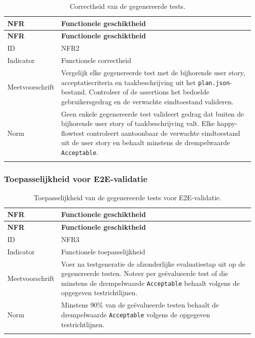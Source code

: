 \begin{longtable}{p{}p{}}
    \toprule
    \textbf{NFR} & \textbf{Functionele geschiktheid} \\
    \midrule
    \endfirsthead
    
    \toprule
    \textbf{NFR} & \textbf{Functionele geschiktheid} \\
    \midrule
    \endhead
    
    ID & NFR2 \\
    \midrule
    Indicator & Functionele correctheid \\
    \midrule
    Meetvoorschrift & Vergelijk elke gegenereerde test met de bijhorende user story, acceptatiecriteria en taakbeschrijving uit het \texttt{plan.json}-bestand. Controleer of de assertions het bedoelde gebruikersgedrag en de verwachte eindtoestand valideren. \\
    \midrule
    Norm & Geen enkele gegenereerde test valideert gedrag dat buiten de bijhorende user story of taakbeschrijving valt. Elke happy-flowtest controleert aantoonbaar de verwachte eindtoestand uit de user story en behaalt minstens de drempelwaarde \texttt{Acceptable}. \\
    
    \bottomrule
    \caption[NFR2: functionele correctheid]{Correctheid van de gegenereerde tests.}
    \label{tab:nfr-functionele-correctheid}
\end{longtable}

\subsubsection{Toepasselijkheid voor E2E-validatie}

\begin{longtable}{p{}p{}}
    \toprule
    \textbf{NFR} & \textbf{Functionele geschiktheid} \\
    \midrule
    \endfirsthead
    
    \toprule
    \textbf{NFR} & \textbf{Functionele geschiktheid} \\
    \midrule
    \endhead
    
    ID & NFR3 \\
    \midrule
    Indicator & Functionele toepasselijkheid \\
    \midrule
    Meetvoorschrift & Voer na testgeneratie de afzonderlijke evaluatiestap uit op de gegenereerde testen. Noteer per geëvalueerde test of die minstens de drempelwaarde \texttt{Acceptable} behaalt volgens de opgegeven testrichtlijnen. \\
    \midrule
    Norm & Minstens 90\% van de geëvalueerde testen behaalt de drempelwaarde \texttt{Acceptable} volgens de opgegeven testrichtlijnen. \\
    
    \bottomrule
    \caption[NFR3: functionele toepasselijkheid]{Toepasselijkheid van de gegenereerde tests voor E2E-validatie.}
    \label{tab:nfr-functionele-toepasselijkheid}
\end{longtable}

